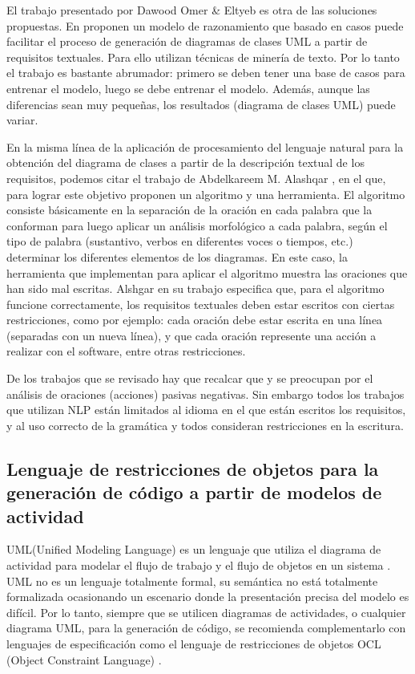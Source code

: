 El trabajo presentado por Dawood Omer \& Eltyeb \cite{Dawood2022} es otra de las soluciones propuestas. En \cite{Dawood2022} proponen un modelo de razonamiento que basado en casos puede facilitar el proceso de generación de diagramas de clases UML a partir de requisitos textuales. Para ello utilizan técnicas de minería de texto. Por lo tanto el trabajo es bastante abrumador: primero se deben tener una base de casos para entrenar el modelo, luego se debe entrenar el modelo. Además, aunque las diferencias sean muy pequeñas, los resultados (diagrama de clases UML) puede variar.

En la misma línea de la aplicación de procesamiento del lenguaje natural para la obtención del diagrama de clases a partir de la descripción textual de los requisitos, podemos citar el trabajo de Abdelkareem M. Alashqar \cite{Alashqar2021}, en el que, para lograr este objetivo proponen un algoritmo y una herramienta. El algoritmo consiste básicamente en la separación de la oración en cada palabra que la conforman para luego aplicar un análisis morfológico a cada palabra, según el tipo de palabra (sustantivo, verbos en diferentes voces o tiempos, etc.) determinar los diferentes elementos de los diagramas. En este caso, la herramienta que implementan para aplicar el algoritmo muestra las oraciones que han sido mal escritas. Alshgar en su trabajo \cite{Alashqar2021} especifica que, para el algoritmo funcione correctamente, los requisitos textuales deben estar escritos con ciertas restricciones, como por ejemplo: cada oración debe estar escrita en una línea (separadas con un nueva línea), y que cada oración represente una acción a realizar con el software, entre otras restricciones. 

De los trabajos que se revisado hay que recalcar que \cite{Alashqar2021} y \cite{Shweta2020} se preocupan por el análisis de oraciones (acciones) pasivas negativas. Sin embargo todos los trabajos que utilizan NLP están limitados al idioma en el que están escritos los requisitos, y al uso correcto de la gramática y todos consideran restricciones en la escritura.

\subsection{Lenguaje de restricciones de objetos para la generación de código a partir de modelos de actividad}
UML(Unified Modeling Language) es un lenguaje que utiliza el diagrama de actividad para modelar el flujo de trabajo y el flujo de objetos en un sistema \cite{Improving}. UML no es un lenguaje totalmente formal, su semántica no está totalmente formalizada ocasionando un escenario donde la presentación precisa del modelo es difícil. Por lo tanto, siempre que se utilicen diagramas de actividades, o cualquier diagrama UML, para la generación de código, se recomienda complementarlo con lenguajes de especificación como el lenguaje de restricciones de objetos OCL (Object Constraint Language) \cite{Object}.   

